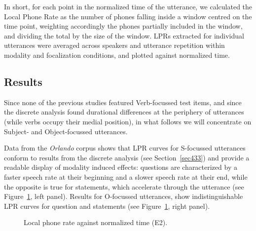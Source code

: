 In short, for each point in the normalized time of the utterance, we calculated the Local Phone Rate as the number of phones falling inside a window centred on the time point, weighting accordingly the phones partially included in the window, and dividing the total by the size of the window. LPRs extracted for individual utterances were averaged across speakers and utterance repetition within modality and focalization conditions, and plotted against normalized time.

\subsection{Results}\label{sec443}
Since none of the previous studies featured Verb-focussed test items, and since the discrete analysis found durational differences at the periphery of utterances (while verbs occupy their medial position), in what follows we will concentrate on Subject- and Object-focussed utterances.

Data from the \textit{Orlando} corpus shows that LPR curves for S-focussed utterances conform to results from the discrete analysis (see Section~\ref{sec433}) and provide a readable display of modality induced effects: questions are characterized by a faster speech rate at their beginning and a slower speech rate at their end, while the opposite is true for statements, which accelerate through the utterance (see Figure~\ref{fig404}, left panel). Results for O-focussed utterances, show indistinguishable LPR curves for question and statements (see Figure~\ref{fig404}, right panel). 

\begin{figure}
\centering
{}
\caption{Local phone rate against normalized time (E2).}
\label{fig404}\end{figure}

